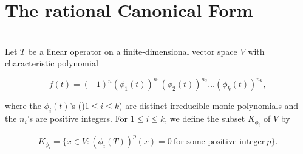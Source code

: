 \section{The rational Canonical Form}

\begin{definition}
	\hfill\\
	Let $T$ be a linear operator on a finite-dimensional vector space $V$ with characteristic polynomial

	\[f(t) = (-1)^n(\phi_1(t))^{n_1}(\phi_2(t))^{n_2} \dots (\phi_k(t))^{n_k},\]

	where the $\phi_i(t)$'s ()$1 \leq i \leq k$) are distinct irreducible monic polynomials and the $n_i$'s are positive integers. For $1 \leq i \leq k$, we define the subset $K_{\phi_i}$ of $V$ by

	\[K_{\phi_i} = \{x \in V : (\phi_i(T))^p(x) = 0\ \text{for some positive integer}\ p\}.\]
\end{definition}

